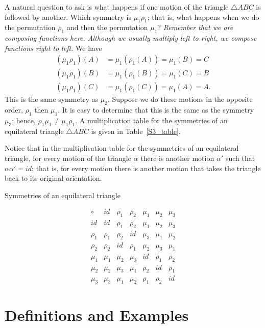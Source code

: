  
A natural question to ask is what happens if one motion of the triangle $\bigtriangleup ABC$ is followed by another.  Which symmetry is $\mu_1 \rho_1$; that is, what happens when we do the permutation $\rho_1$ and then the permutation $\mu_1$?  {\em Remember that we are composing functions here.  Although we usually multiply left to right, we compose functions right to left.} We have
\begin{align*}
(\mu_1 \rho_1)(A)  & = \mu_1( \rho_1( A ) ) = \mu_1( B ) = C \\
(\mu_1 \rho_1)(B) & = \mu_1( \rho_1( B ) ) = \mu_1( C ) = B \\
(\mu_1 \rho_1)(C) & = \mu_1( \rho_1( C ) ) = \mu_1( A ) = A.
\end{align*}
This is the same symmetry as $\mu_2$.  Suppose we do these motions in the opposite order, $\rho_1$ then $\mu_1$.  It is easy to determine that this is the same as the symmetry $\mu_3$; hence, $\rho_1 \mu_1 \neq \mu_1 \rho_1$.  A multiplication table for the symmetries of an equilateral triangle $\bigtriangleup ABC$ is given in Table~\ref{S3_table}.

Notice that in the multiplication table for the symmetries of an equilateral triangle, for every motion of the triangle $\alpha$ there is another motion $\alpha'$ such that $\alpha \alpha' = id$;  that is, for every motion there is another  motion that takes the triangle back to its original orientation.  

\begin{table}
\caption{Symmetries of an equilateral triangle}{\small
\[
\begin{array}{c|cccccc}
\circ  & id     & \rho_1 & \rho_2 & \mu_1 & \mu_2 & \mu_3 \\
\hline
id     & id     & \rho_1 & \rho_2 & \mu_1 & \mu_2 & \mu_3 \\
\rho_1 & \rho_1 & \rho_2 & id     & \mu_3 & \mu_1 & \mu_2 \\
\rho_2 & \rho_2 & id     & \rho_1 & \mu_2 & \mu_3 & \mu_1 \\
\mu_1  & \mu_1  & \mu_2  & \mu_3  & id    & \rho_1& \rho_2\\
\mu_2  & \mu_2  & \mu_3  & \mu_1  & \rho_2& id    & \rho_1\\
\mu_3  & \mu_3  & \mu_1  & \mu_2  & \rho_1& \rho_2& id
\end{array}
\]
}
\label{S3_table}
\end{table}
 
 
\section{Definitions and Examples}\label{groups_section_define}

